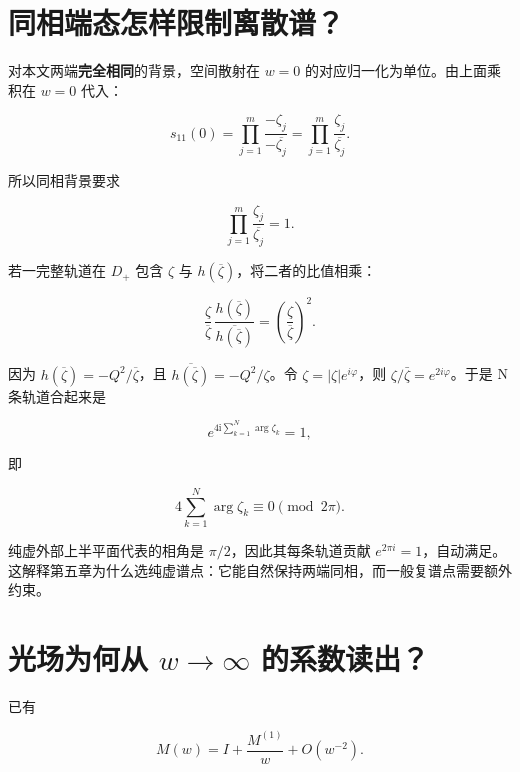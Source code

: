 \section{同相端态怎样限制离散谱？}
\par

对本文两端\textbf{完全相同}的背景，空间散射在 $w=0$ 的对应归一化为单位。由上面乘积在 $w=0$ 代入：\par

\[
s_{11}(0)
=\prod\limits_{j=1}^{m}
\dfrac{-\zeta_j}{-\overline{\zeta_j}}
=\prod\limits_{j=1}^{m}\dfrac{\zeta_j}{\overline{\zeta_j}}.
\]

所以同相背景要求\par

\[
\boxed{
\prod\limits_{j=1}^{m}\dfrac{\zeta_j}{\overline{\zeta_j}}=1.
}
\]

若一完整轨道在 $D_{+}$ 包含 $\zeta{}$ 与 $h(\overline\zeta{})$，将二者的比值相乘：\par

\[
\dfrac{\zeta}{\overline\zeta}\,
\dfrac{h(\overline\zeta)}{\overline{h(\overline\zeta)}}
=\left(\dfrac{\zeta}{\overline\zeta}\right)^2.
\]

因为 $h(\overline\zeta{})=-Q^{2}/\overline\zeta{}$，且 $\overline{h(\overline\zeta{})}=-Q^{2}/\zeta{}$。令 $\zeta{}=|\zeta|e^{i\varphi{}}$，则 $\zeta{}/\bar\zeta{}=e^{2i\varphi{}}$。于是 N 条轨道合起来是\par

\[
e^{4\mathrm{i}\sum\limits_{k=1}^{N}\arg\zeta_k}=1,
\]

即\par

\[
4\sum\limits_{k=1}^{N}\arg\zeta_k
\equiv0\pmod{2\pi}.
\]

纯虚外部上半平面代表的相角是 $\pi{}/2$，因此其每条轨道贡献 $e^{2\pi{}i}=1$，自动满足。这解释第五章为什么选纯虚谱点：它能自然保持两端同相，而一般复谱点需要额外约束。\par

\section{光场为何从 \texorpdfstring{$w\to\infty$}{w -> infinity} 的系数读出？}
\par

已有\par

\[
M(w)=I+\dfrac{M^{(1)}}{w}+O(w^{-2}).
\]

